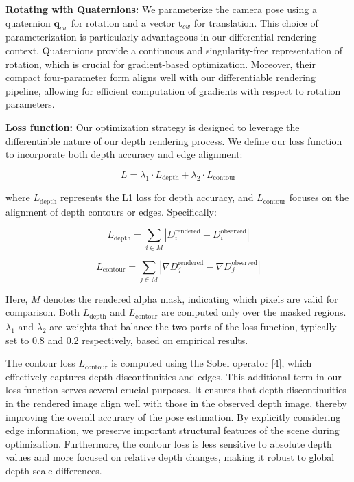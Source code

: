 \documentclass[twocolumn]{article} %
\begin{document}
\textbf{Rotating with Quaternions:} We parameterize the camera pose
using a quaternion \(\mathbf{q}_{cw}\) for rotation and a vector
\(\mathbf{t}_{cw}\) for translation. This choice of parameterization is
particularly advantageous in our differential rendering context.
Quaternions provide a continuous and singularity-free representation of
rotation, which is crucial for gradient-based optimization. Moreover,
their compact four-parameter form aligns well with our differentiable
rendering pipeline, allowing for efficient computation of gradients with
respect to rotation parameters.

\textbf{Loss function:} Our optimization strategy is designed to
leverage the differentiable nature of our depth rendering process. We
define our loss function to incorporate both depth accuracy and edge
alignment:

\[ 
L = \lambda_1 \cdot L_{\text{depth}} + \lambda_2 \cdot L_{\text{contour}} 
\]

where \(L_{\text{depth}}\) represents the L1 loss for depth accuracy,
and \(L_{\text{contour}}\) focuses on the alignment of depth contours or
edges. Specifically:

\[
L_{\text{depth}} = \sum_{i \in M} |D_i^{\text{rendered}} - D_i^{\text{observed}}|
\]

\[
L_{\text{contour}} = \sum_{j \in M} |\nabla D_j^{\text{rendered}} - \nabla D_j^{\text{observed}}|
\]

Here, \(M\) denotes the rendered alpha mask, indicating which pixels are
valid for comparison. Both \(L_{\text{depth}}\) and
\(L_{\text{contour}}\) are computed only over the masked regions.
\(\lambda_1\) and \(\lambda_2\) are weights that balance the two parts
of the loss function, typically set to 0.8 and 0.2 respectively, based
on empirical results.

The contour loss \(L_{\text{contour}}\) is computed using the Sobel
operator {[}4{]}, which effectively captures depth discontinuities and
edges. This additional term in our loss function serves several crucial
purposes. It ensures that depth discontinuities in the rendered image
align well with those in the observed depth image, thereby improving the
overall accuracy of the pose estimation. By explicitly considering edge
information, we preserve important structural features of the scene
during optimization. Furthermore, the contour loss is less sensitive to
absolute depth values and more focused on relative depth changes, making
it robust to global depth scale differences.
\end{document}

